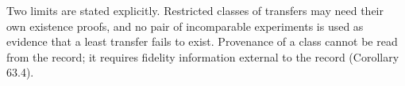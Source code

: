 Two limits are stated explicitly. Restricted classes of transfers may need their own existence proofs, and no pair of incomparable experiments is used as evidence that a least transfer fails to exist. Provenance of a class cannot be read from the record; it requires fidelity information external to the record (Corollary 63.4).
